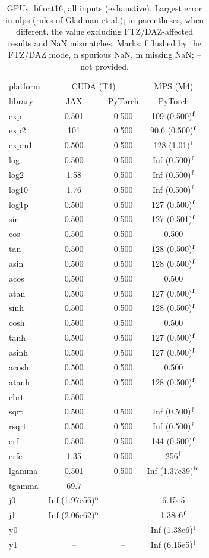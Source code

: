 \begin{table}
\centering
\begin{small}
\begin{tabular}{|l|cc|c|}
\hline
platform & \multicolumn{2}{c|}{CUDA (T4)} & \multicolumn{1}{c|}{MPS (M4)} \\
library & JAX & PyTorch & PyTorch \\ \hline
exp & 0.501 & 0.500 & 109 (0.500)$^{\rm f}$ \\
exp2 & 101 & 0.500 & 90.6 (0.500)$^{\rm f}$ \\
expm1 & 0.500 & 0.500 & 128 (1.01)$^{\rm f}$ \\
log & 0.500 & 0.500 & Inf (0.500)$^{\rm f}$ \\
log2 & 1.58 & 0.500 & Inf (0.500)$^{\rm f}$ \\
log10 & 1.76 & 0.500 & Inf (0.500)$^{\rm f}$ \\
log1p & 0.500 & 0.500 & 127 (0.500)$^{\rm f}$ \\
sin & 0.500 & 0.500 & 127 (0.501)$^{\rm f}$ \\
cos & 0.500 & 0.500 & 0.500 \\
tan & 0.500 & 0.500 & 128 (0.500)$^{\rm f}$ \\
asin & 0.500 & 0.500 & 128 (0.500)$^{\rm f}$ \\
acos & 0.500 & 0.500 & 0.500 \\
atan & 0.500 & 0.500 & 127 (0.500)$^{\rm f}$ \\
sinh & 0.500 & 0.500 & 128 (0.500)$^{\rm f}$ \\
cosh & 0.500 & 0.500 & 0.500 \\
tanh & 0.500 & 0.500 & 127 (0.500)$^{\rm f}$ \\
asinh & 0.500 & 0.500 & 127 (0.500)$^{\rm f}$ \\
acosh & 0.500 & 0.500 & 0.500 \\
atanh & 0.500 & 0.500 & 128 (0.500)$^{\rm f}$ \\
cbrt & 0.500 & -- & -- \\
sqrt & 0.500 & 0.500 & Inf (0.500)$^{\rm f}$ \\
rsqrt & 0.500 & 0.500 & Inf (0.500)$^{\rm f}$ \\
erf & 0.500 & 0.500 & 144 (0.500)$^{\rm f}$ \\
erfc & 1.35 & 0.500 & 256$^{\rm f}$ \\
lgamma & 0.501 & 0.500 & Inf (1.37e39)$^{\rm fn}$ \\
tgamma & 69.7 & -- & -- \\
j0 & Inf (1.97e56)$^{\rm n}$ & -- & 6.15e5 \\
j1 & Inf (2.06e62)$^{\rm n}$ & -- & 1.38e6$^{\rm f}$ \\
y0 & -- & -- & Inf (1.38e6)$^{\rm f}$ \\
y1 & -- & -- & Inf (6.15e5)$^{\rm f}$ \\
\hline
\end{tabular}
\end{small}
\caption{GPUs: bfloat16, all inputs (exhaustive). Largest error in ulps (rules of Gladman et al.); in parentheses, when different, the value excluding FTZ/DAZ-affected results and NaN mismatches. Marks: f flushed by the FTZ/DAZ mode, n spurious NaN, m missing NaN; -- not provided.}
\label{tab:bf16gpu}
\end{table}
